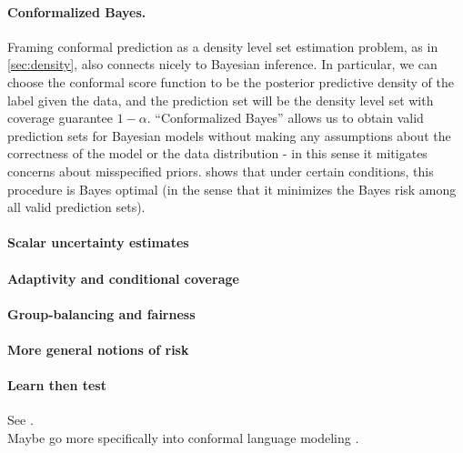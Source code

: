 \documentclass[a4paper, 12pt]{article}
\begin{document}

\paragraph*{Conformalized Bayes.} Framing conformal prediction as a density level set estimation problem, as in \ref{sec:density}, also connects nicely to Bayesian inference. In particular, we can choose the conformal score function to be the posterior predictive density of the label given the data, and the prediction set will be the density level set with coverage guarantee $1-\alpha$. ``Conformalized Bayes'' allows us to obtain valid prediction sets for Bayesian models without making any assumptions about the correctness of the model or the data distribution - in this sense it mitigates concerns about misspecified priors. \textcite{hoffBayesoptimalPredictionFrequentist2021} shows that under certain conditions, this procedure is Bayes optimal (in the sense that it minimizes the Bayes risk among all valid prediction sets).

\paragraph*{Scalar uncertainty estimates}


\paragraph*{Adaptivity and conditional coverage}

\paragraph*{Group-balancing and fairness}

\paragraph*{More general notions of risk}

\paragraph*{Learn then test}
See \textcite{angelopoulosLearnThenTest2022}. \\

Maybe go more specifically into conformal language modeling \autocite{quachConformalLanguageModeling2023}.
\end{document}
